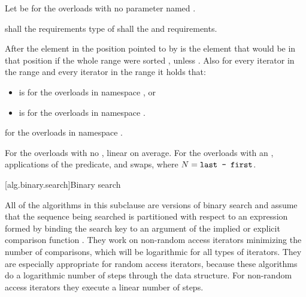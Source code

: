 \begin{itemdescr}
\begin{addedblock}
\pnum
Let  be  for the overloads with no parameter
named .
\end{addedblock}

\pnum
\requires
{}
 shall  the
 requirements type of  shall
 the
 and
 requirements.

\pnum
\effects
After
the element in the position pointed to by 
is the element that would be
in that position if the whole range were
sorted ,
unless .
Also for every iterator
in the range
and every iterator
in the range
it holds that:
\begin{addedblock}
\begin{itemize}
\item {} is  for the overloads in namespace
  , or
\item {} is
   for the overloads in namespace .
\end{itemize}

\pnum
\returns {} for the overloads in namespace .
\end{addedblock}

\pnum
\complexity
For the overloads with no , linear on average.
For the overloads with an ,  applications of
the predicate, and  swaps, where $N = \texttt{last - first}$.
\end{itemdescr}


[alg.binary.search]{Binary search}

\pnum
All of the algorithms in this subclause are versions of binary search
and assume that the sequence being searched is partitioned with respect to
an expression formed by binding the search key to an argument of the
implied or explicit comparison function .
They work on non-random access iterators minimizing the number of comparisons,
which will be logarithmic for all types of iterators.
They are especially appropriate for random access iterators,
because these algorithms do a logarithmic number of steps
through the data structure.
For non-random access iterators they execute a linear number of steps.

